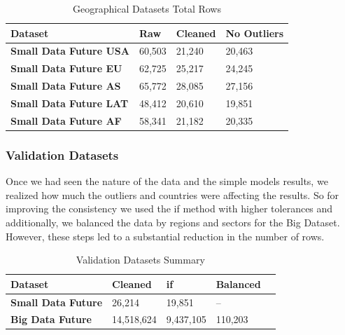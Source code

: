 \documentclass[11pt,english,a4paper,hidelinks]{book}
\begin{document}
\begin{table}[H]
    \centering
    \caption{Geographical Datasets Total Rows}
    \begin{tabular}{|l|l|l|l|}
        \hline  
        \textbf{Dataset} & \textbf{Raw} & \textbf{Cleaned} & \textbf{No Outliers} \\
        \hline
        \textbf{Small Data Future USA} & 60,503 & 21,240 & 20,463 \\
        \hline
        \textbf{Small Data Future EU} & 62,725 & 25,217 & 24,245 \\
        \hline        
        \textbf{Small Data Future AS} & 65,772 & 28,085 & 27,156\\
        \hline
        \textbf{Small Data Future LAT} & 48,412 & 20,610 & 19,851 \\
        \hline
        \textbf{Small Data Future AF} & 58,341 & 21,182 & 20,335 \\
        \hline
        \end{tabular}
    \label{tab:geographical_datasets_rows}
\end{table}

\subsubsection{Validation Datasets}

\noindent  Once we had seen the nature of the data and the simple models results, we realized how much the outliers and countries were affecting the results. So for improving the consistency we used the \acrshort{if} method with higher tolerances and additionally, we balanced the data by regions and sectors for the Big Dataset. However, these steps led to a substantial reduction in the number of rows. 

\begin{table}[H]
    \centering
    \caption{Validation Datasets Summary}
    \begin{tabular}{|l|l|l|l|l|}
        \hline  
        \textbf{Dataset} & \textbf{Cleaned} & \textbf{ \acrshort{if}} & \textbf{{Balanced}} \\
        \hline
        \textbf{Small Data Future} & 26,214 & 19,851 & -- \\
        \hline
        \textbf{Big Data Future} & 14,518,624 & 9,437,105 & 110,203 \\
        \hline
        \end{tabular}
    \label{tab:validation_datasets_summary}
\end{table}
\end{document}
